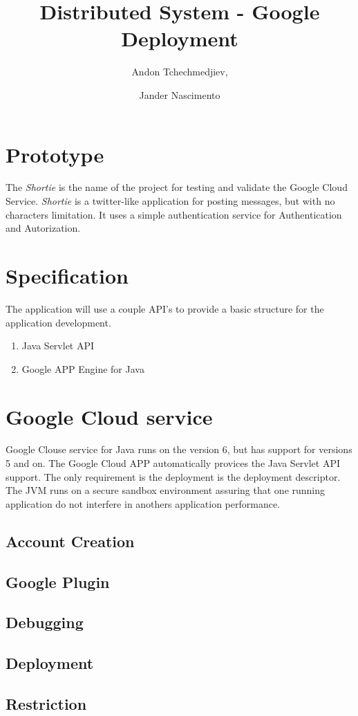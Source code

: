 \documentclass{article}
\begin{document}
\title{Distributed System - Google Deployment}

\author{Andon Tchechmedjiev, 
\and Jander Nascimento}

\maketitle

\section{Prototype}

The \emph{Shortie} is the name of the project for testing and validate the Google Cloud Service.
\emph{Shortie} is a twitter-like application for posting messages, but with no characters limitation. It uses a simple authentication service for Authentication and Autorization.

\section{Specification}

The application will use a couple API's to provide a basic structure for the application development.

\begin{enumerate}
\item Java Servlet API
\item Google APP Engine for Java
\end{enumerate}

\section{Google Cloud service}

Google Clouse service for Java runs on the version 6, but has support for versions 5 and on. The Google Cloud APP automatically provices the Java Servlet API support.
The only requirement is the deployment is the deployment descriptor. 
The JVM runs on a secure sandbox environment assuring that one running application do not interfere in anothers application performance.

\subsection{Account Creation}
\subsection{Google Plugin}
\subsection{Debugging}
\subsection{Deployment}
\subsection{Restriction}
\end{document}
